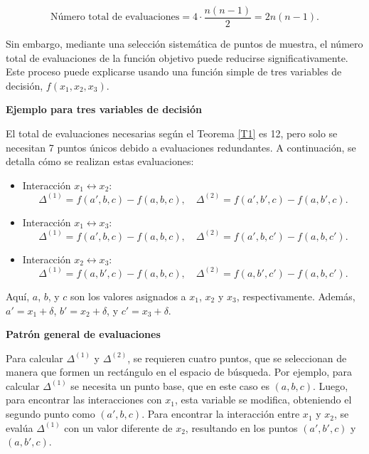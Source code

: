 \[
\text{Número total de evaluaciones} = 4 \cdot \frac{n(n-1)}{2} = 2n(n-1).
\]

Sin embargo, mediante una selección sistemática de puntos de muestra, el número total de evaluaciones de la función objetivo puede reducirse significativamente. Este proceso puede explicarse usando una función simple de tres variables de decisión, \(f(x_1, x_2, x_3)\).

\vspace{10px}

\textbf{Ejemplo para tres variables de decisión}

\vspace{10px}

El total de evaluaciones necesarias según el Teorema \ref{T1} es 12, pero solo se necesitan 7 puntos únicos debido a evaluaciones redundantes. A continuación, se detalla cómo se realizan estas evaluaciones:

\begin{itemize}
    \item Interacción \(x_1 \leftrightarrow x_2\):
    \[
    \Delta^{(1)} = f(a', b, c) - f(a, b, c), \quad \Delta^{(2)} = f(a', b', c) - f(a, b', c).
    \]
    \item Interacción \(x_1 \leftrightarrow x_3\):
    \[
    \Delta^{(1)} = f(a', b, c) - f(a, b, c), \quad \Delta^{(2)} = f(a', b, c') - f(a, b, c').
    \]
    \item Interacción \(x_2 \leftrightarrow x_3\):
    \[
    \Delta^{(1)} = f(a, b', c) - f(a, b, c), \quad \Delta^{(2)} = f(a, b', c') - f(a, b, c').
    \]
\end{itemize}

Aquí, \(a\), \(b\), y \(c\) son los valores asignados a \(x_1\), \(x_2\) y \(x_3\), respectivamente. Además, \(a' = x_1 + \delta\), \(b' = x_2 + \delta\), y \(c' = x_3 + \delta\).

\vspace{10px}
\textbf{Patrón general de evaluaciones}
\vspace{10px}

Para calcular \(\Delta^{(1)}\) y \(\Delta^{(2)}\), se requieren cuatro puntos, que se seleccionan de manera que formen un rectángulo en el espacio de búsqueda. Por ejemplo, para calcular \(\Delta^{(1)}\) se necesita un punto base, que en este caso es \((a, b, c)\). Luego, para encontrar las interacciones con \(x_1\), esta variable se modifica, obteniendo el segundo punto como \((a', b, c)\). Para encontrar la interacción entre \(x_1\) y \(x_2\), se evalúa \(\Delta^{(1)}\) con un valor diferente de \(x_2\), resultando en los puntos \((a', b', c)\) y \((a, b', c)\).

